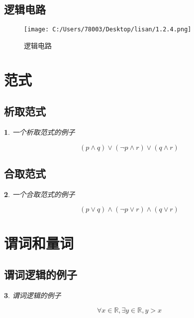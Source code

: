 \documentclass[UTF8]{report}
\def\R{\mathbb{R}}
\theoremstyle{MyLineTheoremStyle} %
\theoremstyle{MyBlockTheoremStyle} %
\theoremstyle{MySubsubsectionStyle} %
\newtheorem{definition}{}
\begin{document}
\cleardoublepage

\subsection{逻辑电路}
\begin{figure}[ht]
\centering
\texttt{[image: C:/Users/78003/Desktop/lisan/1.2.4.png]}
\caption{逻辑电路}
\end{figure}

\section{范式}
\subsection{析取范式}
\begin{definition}
    一个析取范式的例子\par
    \begin{equation}
        (p \land q) \lor (\neg p \land r) \lor (q \land r)
    \end{equation}
\end{definition}

\subsection{合取范式}
\begin{definition}
    一个合取范式的例子\par
    \begin{equation}
        (p \lor q) \land (\neg p \lor r) \land (q \lor r)
    \end{equation}
\end{definition}


\section{谓词和量词}

\subsection{谓词逻辑的例子}

\begin{definition}
    谓词逻辑的例子\par
    \begin{equation}
        \forall x \in \R, \exists y \in \R, y > x
    \end{equation}
\end{definition}
\end{document}
